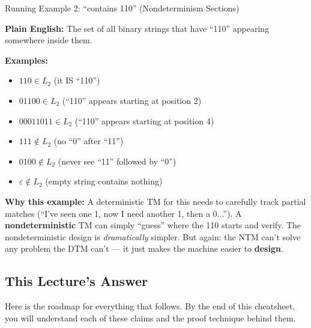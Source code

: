 \begin{definitionbox}{Running Example 2: ``contains 110'' (Nondeterminism Sections)}

\textbf{Plain English:} The set of all binary strings that have ``110'' appearing somewhere inside them.

\textbf{Examples:}
\begin{itemize}[nosep]
\item $110 \in L_2$ \quad (it IS ``110'')
\item $01100 \in L_2$ \quad (``110'' appears starting at position 2)
\item $00011011 \in L_2$ \quad (``110'' appears starting at position 4)
\item $111 \notin L_2$ \quad (no ``0'' after ``11'')
\item $0100 \notin L_2$ \quad (never see ``11'' followed by ``0'')
\item $\varepsilon \notin L_2$ \quad (empty string contains nothing)
\end{itemize}

\textbf{Why this example:} A deterministic TM for this needs to carefully track partial matches (``I've seen one 1, now I need another 1, then a 0...''). A \textbf{nondeterministic} TM can simply ``guess'' where the 110 starts and verify. The nondeterministic design is \textit{dramatically} simpler. But again: the NTM can't solve any problem the DTM can't --- it just makes the machine easier to \textbf{design}.
\end{definitionbox}

\subsection{This Lecture's Answer}
\label{subsec:lecture-answer}

Here is the roadmap for everything that follows. By the end of this cheatsheet, you will understand each of these claims and the proof technique behind them.

